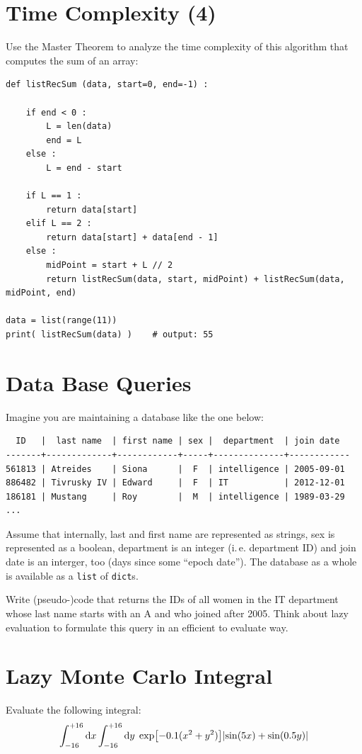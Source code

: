 \documentclass[
	english,
	fontsize=10pt,
	parskip=half,
	titlepage=true,
	DIV=12
]{scrartcl}
\newcommand*{\inPy}[1]{\texttt{#1}}
\newcommand*{\ie}{i.\,e.\xspace}
\begin{document}
\section{Time Complexity (4)}
Use the Master Theorem to analyze the time complexity of this algorithm that computes the sum of an array:
\begin{verbatim}
def listRecSum (data, start=0, end=-1) :
    
    if end < 0 : 
        L = len(data)
        end = L
    else :
        L = end - start
    
    if L == 1 :
        return data[start]
    elif L == 2 :
        return data[start] + data[end - 1]
    else :
        midPoint = start + L // 2
        return listRecSum(data, start, midPoint) + listRecSum(data, midPoint, end)

data = list(range(11))
print( listRecSum(data) )    # output: 55
\end{verbatim}

\section{Data Base Queries}
Imagine you are maintaining a database like the one below:
\begin{verbatim}
  ID   |  last name  | first name | sex |  department  | join date
-------+-------------+------------+-----+--------------+------------
561813 | Atreides    | Siona      |  F  | intelligence | 2005-09-01
886482 | Tivrusky IV | Edward     |  F  | IT           | 2012-12-01
186181 | Mustang     | Roy        |  M  | intelligence | 1989-03-29
...
\end{verbatim}

Assume that internally, last and first name are represented as strings, sex is represented as a boolean, department is an integer (\ie department ID) and join date is an interger, too (days since some \enquote{epoch date}). The database as a whole is available as a \inPy{list} of \inPy{dict}s.

Write (pseudo-)code that returns the IDs of all women in the IT department whose last name starts with an A and who joined after 2005. Think about lazy evaluation to formulate this query in an efficient to evaluate way.

\section{Lazy Monte Carlo Integral}
Evaluate the following integral:
\[
	\int_{-16}^{+16} \dd{x}
	\int_{-16}^{+16} \dd{y} \;
		\exp[-0.1 (x^2 + y^2)]
		\qty|
			\sin(5 x) + \sin(0.5 y)
		|
\]
\end{document}
